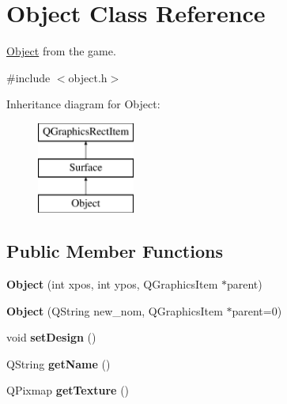 \hypertarget{class_object}{}\section{Object Class Reference}
\label{class_object}


\hyperlink{class_object}{Object} from the game.  




{\ttfamily \#include $<$object.\+h$>$}

Inheritance diagram for Object\+:\begin{figure}[H]
\begin{center}
\leavevmode
\includegraphics[height=3.000000cm]{class_object}
\end{center}
\end{figure}
\subsection*{Public Member Functions}
\begin{DoxyCompactItemize}
\item 
\hypertarget{class_object_a61b5e9862ead7000e3125be5d81263a2}{}{\bfseries Object} (int xpos, int ypos, Q\+Graphics\+Item $\ast$parent)\label{class_object_a61b5e9862ead7000e3125be5d81263a2}

\item 
\hypertarget{class_object_a92bae89e044afc5957483772f557c5d7}{}{\bfseries Object} (Q\+String new\+\_\+nom, Q\+Graphics\+Item $\ast$parent=0)\label{class_object_a92bae89e044afc5957483772f557c5d7}

\item 
\hypertarget{class_object_a64d92ae18b1e70a8435690fe6fccf1fd}{}void {\bfseries set\+Design} ()\label{class_object_a64d92ae18b1e70a8435690fe6fccf1fd}

\item 
\hypertarget{class_object_a13fe059222e66ea54aa3f6f8615a3d72}{}Q\+String {\bfseries get\+Name} ()\label{class_object_a13fe059222e66ea54aa3f6f8615a3d72}

\item 
\hypertarget{class_object_a2678fa7a8ab432607b228e8d311f2873}{}Q\+Pixmap {\bfseries get\+Texture} ()\label{class_object_a2678fa7a8ab432607b228e8d311f2873}

\end{DoxyCompactItemize}


